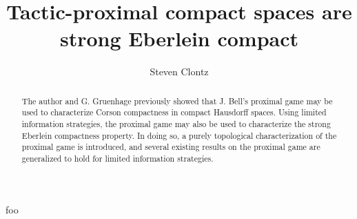 \documentclass{amsart}
\theoremstyle{definition}
\theoremstyle{remark}
\newcommand{\<}{\langle}
\renewcommand{\>}{\rangle}
\newcommand{\term}{\textit}
\begin{document}
\title{Tactic-proximal compact spaces are strong Eberlein compact}




\author{Steven Clontz}
\address{Department of Mathematics, Auburn University,
Auburn, AL 36830}




\begin{abstract}
The author and G. Gruenhage previously showed that J. Bell's proximal game may
be used to characterize Corson compactness in compact Hausdorff spaces.
Using limited information strategies, the proximal game may also be
used to characterize the strong Eberlein compactness property.
In doing so, a purely topological characterization of the proximal game
is introduced, and several existing results on
the proximal game are generalized to hold for limited information strategies.
\end{abstract}


\maketitle

foo \cite{Kunen1981283}




\end{document}

